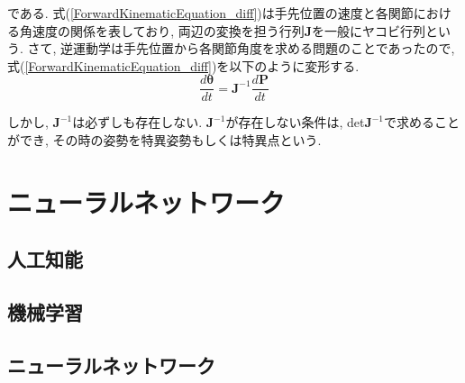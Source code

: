 \documentclass{suribt}
\begin{document}
である. 式(\ref{ForwardKinematicEquation_diff})は手先位置の速度と各関節における角速度の関係を表しており, 両辺の変換を担う行列${\bm J}$を一般にヤコビ行列という. 
さて, 逆運動学は手先位置から各関節角度を求める問題のことであったので, 式(\ref{ForwardKinematicEquation_diff})を以下のように変形する.
\begin{equation}
	\label{ForwardKinematicEquation_diff}
	\frac{d{\bm \theta}}{dt} = {\bm J}^{-1}\frac{d{\bm P}}{dt}
\end{equation}

しかし, ${\bm J^{-1}}$は必ずしも存在しない. ${\bm J^{-1}}$が存在しない条件は, det${\bm J^{-1}}$で求めることができ, その時の姿勢を特異姿勢もしくは特異点という. 


\chapter{ニューラルネットワーク}

\section{人工知能}





\section{機械学習}



\section{ニューラルネットワーク}
\end{document}
